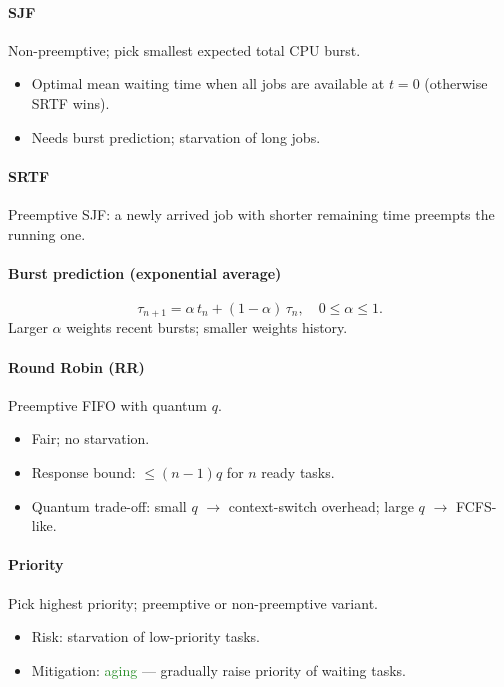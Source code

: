 \paragraph{SJF} Non-preemptive; pick smallest expected total CPU burst.
\begin{itemize}
  \item \textcolor{Bittersweet}{Optimal} mean waiting time when all jobs are available at $t=0$ (otherwise SRTF wins).
  \item Needs burst prediction; \textcolor{Bittersweet}{starvation} of long jobs.
\end{itemize}

\paragraph{SRTF} Preemptive SJF: a newly arrived job with shorter remaining time preempts the running one.

\paragraph{Burst prediction (exponential average)}
\[\tau_{n+1}=\alpha\, t_n+(1-\alpha)\,\tau_n,\quad 0\le\alpha\le 1.\]
Larger $\alpha$ weights recent bursts; smaller weights history.

\paragraph{Round Robin (RR)} Preemptive FIFO with quantum $q$.
\begin{itemize}
  \item Fair; no starvation.
  \item \textcolor{Bittersweet}{Response bound}: $\le (n-1)q$ for $n$ ready tasks.
  \item \textcolor{Bittersweet}{Quantum trade-off}: small $q$ $\to$ context-switch overhead; large $q$ $\to$ FCFS-like.
\end{itemize}

\paragraph{Priority} Pick highest priority; preemptive or non-preemptive variant.
\begin{itemize}
  \item Risk: \textcolor{Bittersweet}{starvation} of low-priority tasks.
  \item Mitigation: \textcolor{ForestGreen}{aging} — gradually raise priority of waiting tasks.
\end{itemize}

